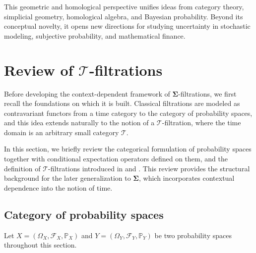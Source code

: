 \documentclass[12pt, a4paper]{amsart}
\theoremstyle{plain}
\theoremstyle{definition}
\numberwithin{figure}{section}
\numberwithin{table}{section}
\numberwithin{equation}{section}
\newcommand{\bSigma}{\mathbf{\Sigma}}
\begin{document}
This geometric and homological perspective unifies ideas from category theory, 
simplicial geometry, homological algebra, 
and Bayesian probability. 
Beyond its conceptual novelty, 
it opens new directions for studying uncertainty 
in stochastic modeling, subjective probability, and mathematical finance.



\section{Review of $\mathcal{T}$-filtrations}
\label{sec:Tfiltration}

Before developing the context-dependent framework of $\bSigma$-filtrations, 
we first recall the foundations on which it is built. 
Classical filtrations are modeled as contravariant functors
from a time category to the category of probability spaces, 
and this idea extends naturally to the notion of a $\mathcal{T}$-filtration, 
where the time domain is an arbitrary small category $\mathcal{T}$.

In this section, 
we briefly review the categorical formulation of probability spaces 
together with conditional expectation operators defined on them,
and the definition of $\mathcal{T}$-filtrations 
introduced in 
\cite{AR_2019}
and
\cite{ANR_2020b}.
This review provides the structural background 
for the later generalization to $\bSigma$, 
which incorporates contextual dependence into the notion of time.


\subsection{Category of probability spaces}
\label{sec:catProb}


Let
$
X
	=
(\Omega_X, \mathcal{F}_X, \mathbb{P}_X)
$
and
$
Y
	=
(\Omega_Y, \mathcal{F}_Y, \mathbb{P}_Y)
$
be two probability spaces
throughout this section.
\end{document}
